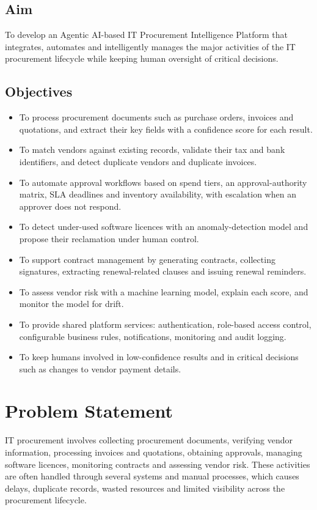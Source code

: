 \subsection{Aim}
To develop an Agentic AI-based IT Procurement Intelligence Platform that integrates, automates and intelligently manages the major activities of the IT procurement lifecycle while keeping human oversight of critical decisions.

\subsection{Objectives}
\begin{itemize}
  \item To process procurement documents such as purchase orders, invoices and quotations, and extract their key fields with a confidence score for each result.
  \item To match vendors against existing records, validate their tax and bank identifiers, and detect duplicate vendors and duplicate invoices.
  \item To automate approval workflows based on spend tiers, an approval-authority matrix, SLA deadlines and inventory availability, with escalation when an approver does not respond.
  \item To detect under-used software licences with an anomaly-detection model and propose their reclamation under human control.
  \item To support contract management by generating contracts, collecting signatures, extracting renewal-related clauses and issuing renewal reminders.
  \item To assess vendor risk with a machine learning model, explain each score, and monitor the model for drift.
  \item To provide shared platform services: authentication, role-based access control, configurable business rules, notifications, monitoring and audit logging.
  \item To keep humans involved in low-confidence results and in critical decisions such as changes to vendor payment details.
\end{itemize}

\section{Problem Statement}
IT procurement involves collecting procurement documents, verifying vendor information, processing invoices and quotations, obtaining approvals, managing software licences, monitoring contracts and assessing vendor risk. These activities are often handled through several systems and manual processes, which causes delays, duplicate records, wasted resources and limited visibility across the procurement lifecycle.

